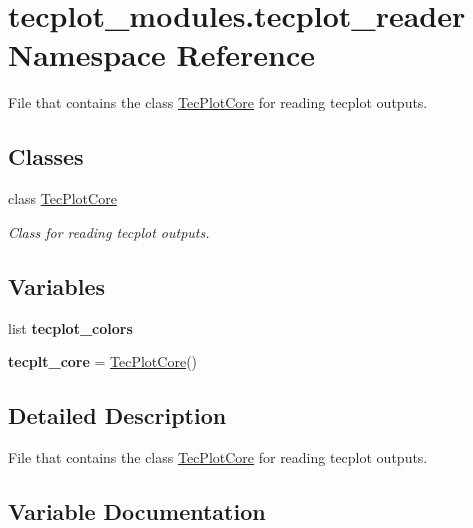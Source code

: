 \hypertarget{a00068}{}\section{tecplot\+\_\+modules.\+tecplot\+\_\+reader Namespace Reference}
\label{a00068}


File that contains the class \hyperlink{a00125}{Tec\+Plot\+Core} for reading tecplot outputs.  


\subsection*{Classes}
\begin{DoxyCompactItemize}
\item 
class \hyperlink{a00125}{Tec\+Plot\+Core}
\begin{DoxyCompactList}\small\item\em Class for reading tecplot outputs. \end{DoxyCompactList}\end{DoxyCompactItemize}
\subsection*{Variables}
\begin{DoxyCompactItemize}
\item 
list {\bfseries tecplot\+\_\+colors}
\item 
\hypertarget{a00068_a451a17322511f6ada93a0d61c5aa34c9}{}\label{a00068_a451a17322511f6ada93a0d61c5aa34c9} 
{\bfseries tecplt\+\_\+core} = \hyperlink{a00125}{Tec\+Plot\+Core}()
\end{DoxyCompactItemize}


\subsection{Detailed Description}
File that contains the class \hyperlink{a00125}{Tec\+Plot\+Core} for reading tecplot outputs. 

\subsection{Variable Documentation}
\hypertarget{a00068_a1e797fe85a325b8a8f10b118db5c9a47}{}\label{a00068_a1e797fe85a325b8a8f10b118db5c9a47} 
